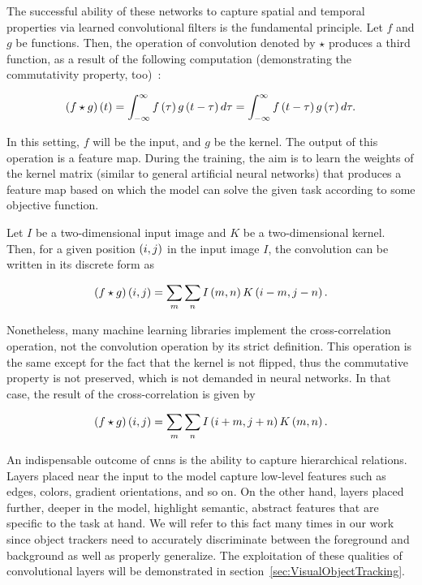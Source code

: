 The successful ability of these networks to capture spatial and temporal properties via learned convolutional filters is the fundamental principle. Let $f$ and $g$ be functions. Then, the operation of convolution denoted by $\star$ produces a third function, as a result of the following computation (demonstrating the commutativity property, too)~\cite{Goodfellow-et-al-2016}:

\begin{equation}
    \label{eq:ConvolutionContinuous}
    {\left( {f \star g} \right)} \left( t \right) =
    \int_{-\infty}^{\infty}
    {f} \left( \tau \right)
    {g} \left( t - \tau \right)
    d\tau =
    \int_{-\infty}^{\infty}
    {f} \left( t -\tau \right)
    {g} \left( \tau \right)
    d\tau.
\end{equation}

\noindent In this setting, $f$ will be the input, and $g$ be the kernel. The output of this operation is a feature map. During the training, the aim is to learn the weights of the kernel matrix (similar to general artificial neural networks) that produces a feature map based on which the model can solve the given task according to some objective function.

Let $I$ be a two-dimensional input image and $K$ be a two-dimensional kernel. Then, for a given position $\left( {i, j} \right)$ in the input image $I$, the convolution can be written in its discrete form as

\begin{equation}
    \label{eq:ConvolutionDiscrete}
    {\left( {f \star g} \right)} \left( i, j \right) =
    \sum_{m}
    \sum_{n}
    {I} \left( m, n \right)
    {K} \left( i - m, j - n \right).
\end{equation}

\noindent Nonetheless, many machine learning libraries implement the cross-correlation operation, not the convolution operation by its strict definition. This operation is the same except for the fact that the kernel is not flipped, thus the commutative property is not preserved, which is not demanded in neural networks. In that case, the result of the cross-correlation is given by~\cite{Goodfellow-et-al-2016}

\begin{equation}
    \label{eq:CrossCorrelation}
    {\left( {f \star g} \right)} \left( i, j \right) =
    \sum_{m}
    \sum_{n}
    {I} \left( i + m, j + n \right)
    {K} \left( m, n \right).
\end{equation}

An indispensable outcome of \glspl{cnn} is the ability to capture hierarchical relations. Layers placed near the input to the model capture low-level features such as edges, colors, gradient orientations, and so on. On the other hand, layers placed further, deeper in the model, highlight semantic, abstract features that are specific to the task at hand. We will refer to this fact many times in our work since object trackers need to accurately discriminate between the foreground and background as well as properly generalize. The exploitation of these qualities of convolutional layers will be demonstrated in section~\ref{sec:VisualObjectTracking}.

